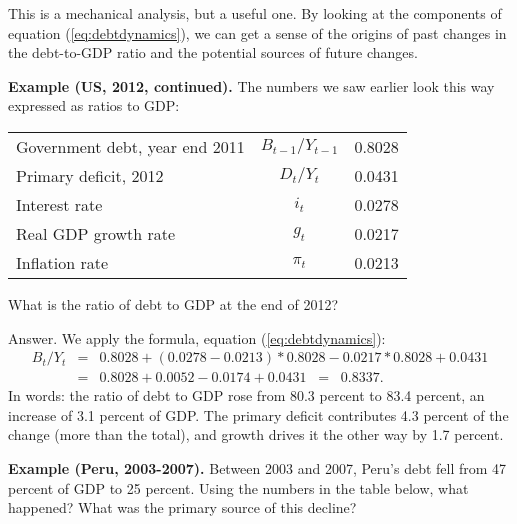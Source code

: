 This is a mechanical analysis, but a useful one.
By looking at the components of equation (\ref{eq:debtdynamics}),
we can get a sense of the origins of past changes in the debt-to-GDP ratio
and the potential sources of future changes.


{\bf Example (US, 2012, continued).}
The numbers we saw earlier look this way expressed as ratios to GDP:

\begin{center}
\begin{tabular}{lcr}
\toprule
%
Government debt, year end 2011  &  $B_{t-1}/Y_{t-1}$ & 0.8028 \\
Primary deficit, 2012           &  $D_t/Y_t$         & 0.0431 \\
Interest rate                   &  $i_t$             & 0.0278 \\
Real GDP growth rate            &  $g_t$             & 0.0217 \\
Inflation rate                  &  $\pi_t$           & 0.0213 \\
\bottomrule
\end{tabular}
\end{center}

What is the ratio of debt to GDP at the end of 2012?

Answer.  We apply the formula, equation (\ref{eq:debtdynamics}):
\begin{eqnarray*}
    {B_{t}}/{Y_{t}} &=&  0.8028  + (0.0278-0.0213)*0.8028 - 0.0217*0.8028 + 0.0431 \\
            &=&  0.8028 + 0.0052 - 0.0174 + 0.0431 \;\;=\;\; 0.8337.
\end{eqnarray*}
In words:  the ratio of debt to GDP rose from 80.3 percent to 83.4 percent,
an increase of 3.1 percent of GDP.
The primary deficit contributes 4.3 percent of the change (more than the total),
and growth drives it the other way by 1.7 percent.

\textbf{Example (Peru, 2003-2007).}
Between 2003 and 2007,
Peru's debt fell from 47 percent of GDP to 25 percent.
Using the numbers in the table below, what happened?
What was the primary source of this decline?

